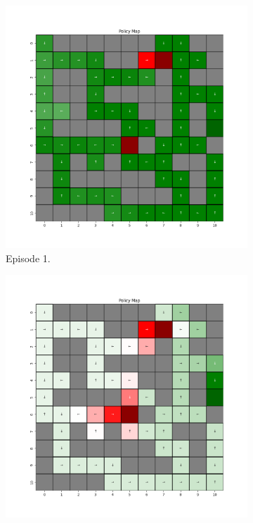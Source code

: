 \documentclass{assignment}
\begin{document}
\begin{figure}[H]
    \begin{subfigure}{0.3\textwidth}
        \includegraphics[width=\textwidth]{figures/policy_td/epsilon_sweep/policy_alpha_0.1_gamma_0.95_epsilon_0.8_iteration_1.png}
    \caption{Episode 1.}
    \end{subfigure}\hfill
    \begin{subfigure}{0.3\textwidth}
        \includegraphics[width=\textwidth]{figures/policy_td/epsilon_sweep/policy_alpha_0.1_gamma_0.95_epsilon_0.8_iteration_50.png}

\end{subfigure}
\end{figure}
\end{document}
